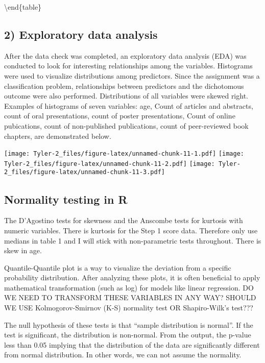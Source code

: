 \documentclass[12pt,]{article}
\begin{document}
\textbackslash{}end\{table\}

\hypertarget{exploratory-data-analysis}{%
\subsection{2) Exploratory data
analysis}\label{exploratory-data-analysis}}

After the data check was completed, an exploratory data analysis (EDA)
was conducted to look for interesting relationships among the variables.
Histograms were used to visualize distributions among predictors. Since
the assignment was a classification problem, relationships between
predictors and the dichotomous outcome were also performed.
Distributions of all variables were skewed right. Examples of histograms
of seven variables: age, Count of articles and abstracts, count of oral
presentations, count of poster presentations, Count of online
pubications, count of non-published publications, count of peer-reviewed
book chapters, are demonstrated below.

\texttt{[image: Tyler-2\_files/figure-latex/unnamed-chunk-11-1.pdf]}
\texttt{[image: Tyler-2\_files/figure-latex/unnamed-chunk-11-2.pdf]}
\texttt{[image: Tyler-2\_files/figure-latex/unnamed-chunk-11-3.pdf]}

\hypertarget{normality-testing-in-r}{%
\subsection{Normality testing in R}\label{normality-testing-in-r}}

The D'Agostino tests for skewness and the Anscombe tests for kurtosis
with numeric variables. There is kurtosis for the Step 1 score data.
Therefore only use medians in table 1 and I will stick with
non-parametric tests throughout. There is skew in age.

Quantile-Quantile plot is a way to visualize the deviation from a
specific probability distribution. After analyzing these plots, it is
often beneficial to apply mathematical transformation (such as log) for
models like linear regression. DO WE NEED TO TRANSFORM THESE VARIABLES
IN ANY WAY? SHOULD WE USE Kolmogorov-Smirnov (K-S) normality test OR
Shapiro-Wilk's test???

The null hypothesis of these tests is that ``sample distribution is
normal''. If the test is significant, the distribution is non-normal.
From the output, the p-value less than 0.05 implying that the
distribution of the data are significantly different from normal
distribution. In other words, we can not assume the normality.
\end{document}
